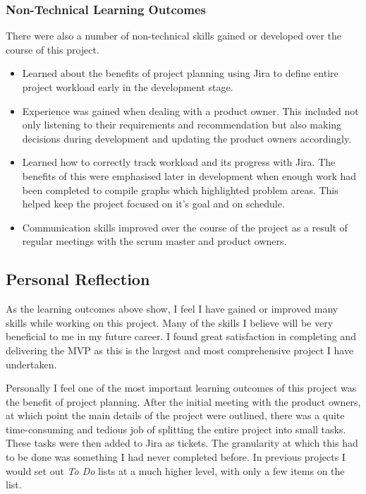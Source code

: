   \subsubsection{Non-Technical Learning Outcomes}
  There were also a number of  non-technical skills gained or developed over the course of this project.
  
  \begin{itemize}
    \item Learned about the benefits of project planning using Jira to define entire project workload early in the development stage.
    \item Experience was gained when dealing with a product owner. This included not only listening to their requirements and recommendation but also making decisions during development and updating the product owners accordingly.
    \item Learned how to correctly track workload and its progress with Jira. The benefits of this were emphasised later in development when enough work had been completed to compile graphs which highlighted problem areas. This helped keep the project focused on it's goal and on schedule.
    \item Communication skills improved over the course of the project as a result of regular meetings with the scrum master and product owners.
  \end{itemize}
	
  \subsection{Personal Reflection}
  As the learning outcomes above show, I feel I have gained or improved many skills while working on this project. Many of the skills I believe will be very beneficial to me in my future career. I found great satisfaction in completing and delivering the MVP as this is the largest and most comprehensive project I have undertaken.
  
  Personally I feel one of the most important learning outcomes of this project was the benefit of project planning. After the initial meeting with the product owners, at which point the main details of the project were outlined, there was a quite time-consuming and tedious job of splitting the entire project into small tasks. These tasks were then added to Jira as tickets. The granularity at which this had to be done was something I had never completed before. In previous projects I would set out \textit{To Do} lists at a much higher level, with only a few items on the list. 
  
